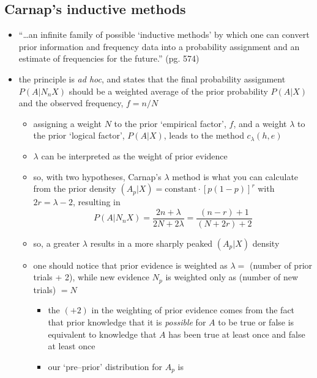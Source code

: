 \documentclass[../jaynes_prob_theory_notes.tex]{subfiles}
\begin{document}
            \subsection{Carnap's inductive methods}
                \begin{itemize} 
                    \item ``\ldots an infinite family of possible `inductive methods' by which one can convert prior information and frequency data into a probability assignment and an estimate of frequencies for the future.'' (pg. 574)
                    \item the principle is \textit{ad hoc}, and states that the final probability assignment \(P(A|N_n X)\) should be a weighted average of the prior probability \(P(A|X)\) and the observed frequency, \(f=n/N\) 
                        \begin{itemize} 
                            \item assigning a weight \(N\) to the prior `empirical factor', \(f\), and a weight \(\lambda\) to the prior `logical factor', \(P(A|X)\), leads to the method \(c_{\lambda}(h,e)\)
                            \item \(\lambda\) can be interpreted as the weight of prior evidence
                            \item so, with two hypotheses, Carnap's \(\lambda\) method is what you can calculate from the prior density \((A_p|X) = \text{constant} \cdot {[p(1-p)]}^r\) with \(2r = \lambda - 2\), resulting in
                                \[
                                    P(A|N_n X) = \frac{2n + \lambda}{2N + 2\lambda} = \frac{(n-r) + 1}{(N+ 2r) + 2}
                                \]
                            \item so, a greater \(\lambda\) results in a more sharply peaked \((A_p | X)\) density
                            \item one should notice that prior evidence is weighted as \(\lambda =\) (number of prior trials + 2), while new evidence \(N_p\) is weighted only as (number of new trials) \(= N\)
                                \begin{itemize} 
                                    \item the \((+2)\) in the weighting of prior evidence comes from the fact that prior knowledge that it is \textit{possible} for \(A\) to be true or false is equivalent to knowledge that \(A\) has been true at least once and false at least once
                                    \item our `pre--prior' distribution for \(A_p\) is 

\end{itemize}
\end{itemize}
\end{itemize}
\end{document}
